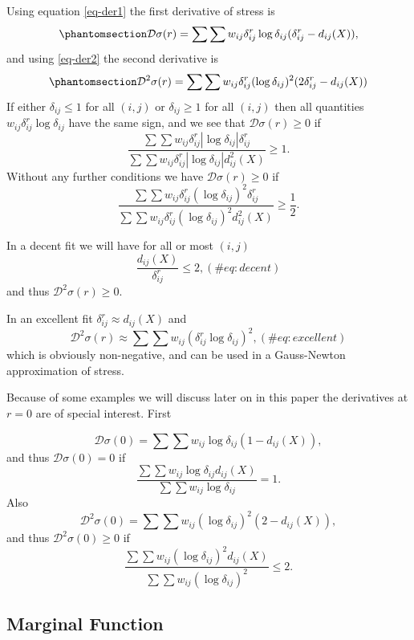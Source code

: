 \documentclass[
  12pt,
  letterpaper,
  DIV=11,
  numbers=noendperiod]{scrartcl}
\begin{document}
Using equation \eqref{eq-der1} the first derivative of stress is
\begin{equation}\phantomsection\label{eq-first}{
\mathcal{D}\sigma(r)=\sum\sum w_{ij}\delta_{ij}^r\log\delta_{ij}(\delta_{ij}^r-d_{ij}(X)),
}\end{equation} and using \eqref{eq-der2} the second derivative is
\begin{equation}\phantomsection\label{eq-second}{
\mathcal{D}^2\sigma(r)=\sum\sum w_{ij}\delta_{ij}^r(\log\delta_{ij})^2(2\delta_{ij}^r-d_{ij}(X))
}\end{equation} If either \(\delta_{ij}\leq 1\) for all \((i,j)\) or
\(\delta_{ij}\geq 1\) for all \((i,j)\) then all quantities
\(w_{ij}\delta_{ij}^r\log\delta_{ij}\) have the same sign, and we see
that \(\mathcal{D}\sigma(r)\geq 0\) if
\[\frac{\sum\sum w_{ij}\delta_{ij}^r|\log\delta_{ij}|\delta_{ij}^r}
{\sum\sum w_{ij}\delta_{ij}^r|\log\delta_{ij}|d_{ij}^2(X)}\geq 1.
\] Without any further conditions we have \(\mathcal{D}\sigma(r)\geq 0\)
if \[\frac{\sum\sum w_{ij}\delta_{ij}^r(\log\delta_{ij})^2\delta_{ij}^r}
{\sum\sum w_{ij}\delta_{ij}^r(\log\delta_{ij})^2d_{ij}^2(X)}\geq\frac12.
\]

In a decent fit we will have for all or most \((i,j)\)\\
\begin{equation}
\frac{d_{ij}(X)}{\delta_{ij}^r}\leq 2,
(\#eq:decent)
\end{equation} and thus \(\mathcal{D}^2\sigma(r)\geq 0\).

In an excellent fit \(\delta_{ij}^r\approx d_{ij}(X)\) and
\begin{equation}
\mathcal{D}^2\sigma(r)\approx\sum\sum w_{ij}(\delta_{ij}^r\log\delta_{ij})^2,
(\#eq:excellent)
\end{equation} which is obviously non-negative, and can be used in a
Gauss-Newton approximation of stress.

Because of some examples we will discuss later on in this paper the
derivatives at \(r=0\) are of special interest. First

\[
\mathcal{D}\sigma(0)=\sum\sum w_{ij}\log\delta_{ij}(1-d_{ij}(X)),
\] and thus \(\mathcal{D}\sigma(0)=0\) if \[
\frac{\sum\sum w_{ij}\log\delta_{ij}d_{ij}(X)}{\sum\sum w_{ij}\log\delta_{ij}}=1.
\] Also \[
\mathcal{D}^2\sigma(0)=\sum\sum w_{ij}(\log\delta_{ij})^2(2-d_{ij}(X)),
\] and thus \(\mathcal{D}^2\sigma(0)\geq 0\) if \[
\frac{\sum\sum w_{ij}(\log\delta_{ij})^2d_{ij}(X)}{\sum\sum w_{ij}(\log\delta_{ij})^2}\leq 2.
\]

\subsection{Marginal Function}\label{marginal-function}
\end{document}
